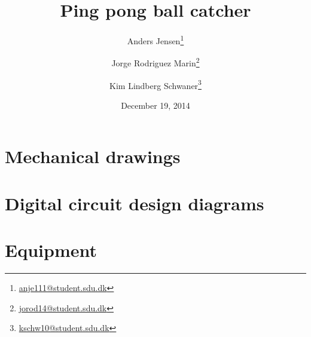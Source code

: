 \documentclass[]{scrbook}
\title{Ping pong ball catcher}
\date{December 19, 2014}
\author{Anders Jensen\thanks{\url{anje111@student.sdu.dk}}}
\author{Jorge Rodriguez Marin\thanks{\url{jorod14@student.sdu.dk}}}
\author{Kim Lindberg Schwaner\thanks{\url{kschw10@student.sdu.dk}}}
\affil{University of Southern Denmark\\Faculty of Engineering\\EMB1}
\begin{document}
	\maketitle
	
	\tableofcontents
	
	
	
	
	
	
	
	
	

	\printbibliography[heading=bibintoc]

	\appendix
		\chapter{Mechanical drawings}
		\label{chap:mechanical_drawings}
			

		\chapter{Digital circuit design diagrams}
		\label{chap:digi_diagrams}
			
			

		\chapter{Equipment}
		\label{chap:equipment}
			
\end{document}
